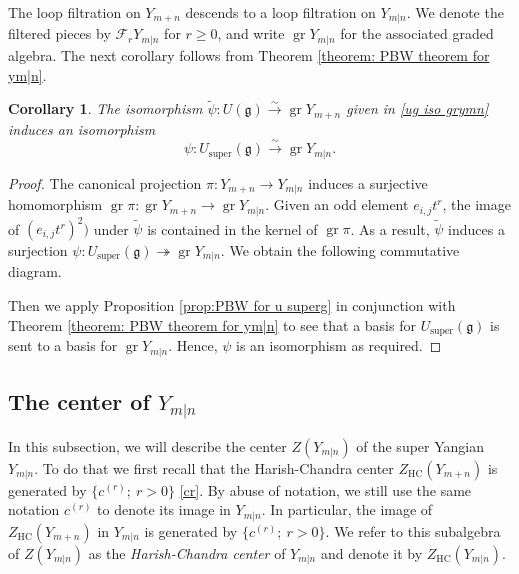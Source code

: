 \documentclass[12pt,reqno]{amsart}
\newcommand{\cF}{\mathcal{F}}
\newcommand{\fg}{\mathfrak{g}}
\DeclareMathOperator{\super}{super}
\DeclareMathOperator{\gr}{gr}
\DeclareMathOperator{\HC}{HC}
\numberwithin{equation}{section}
\newtheorem{Corollary}[Theorem]{Corollary}
\theoremstyle{Theorem}
\theoremstyle{remark}
\numberwithin{equation}{section}
\begin{document}
The loop filtration on $Y_{m+n}$ descends to a loop filtration on $Y_{m|n}$.
We denote the filtered pieces by $\cF_r Y_{m|n}$ for $ r\geq 0$,
and write $\gr Y_{m|n}$ for the associated graded algebra.
The next corollary follows from Theorem \ref{theorem: PBW theorem for ym|n}.
\begin{Corollary}\label{coro:u super g iso gr ym|n}
The isomorphism $\tilde{\psi}:U(\fg)\stackrel{\sim}{\longrightarrow}\gr Y_{m+n}$ given in \eqref{ug iso grymn} induces an isomorphism
\[
\psi:U_{\super}(\fg)\stackrel{\sim}{\longrightarrow}\gr Y_{m|n}.
\]
\end{Corollary}
\begin{proof}
The canonical projection $\pi:Y_{m+n}\rightarrow Y_{m|n}$ induces a surjective homomorphism $\gr\pi:\gr Y_{m+n}\rightarrow \gr Y_{m|n}$.
Given an odd element $e_{i,j}t^r$, 
the image of $(e_{i,j}t^r)^2)$ under $\tilde{\psi}$ is contained in the kernel of $\gr\pi$.
As a result,
$\tilde{\psi}$ induces a surjection $\psi:U_{\super}(\fg)\twoheadrightarrow\gr Y_{m|n}$.
We obtain the following commutative diagram.
\begin{center}
\end{center}
Then we apply Proposition \ref{prop:PBW for u superg} in conjunction with Theorem \ref{theorem: PBW theorem for ym|n} to see that a basis for $U_{\super}(\fg)$ is sent to a basis for $\gr Y_{m|n}$.
Hence, $\psi$ is an isomorphism as required.
\end{proof}
\subsection{ The center of $Y_{m|n}$}
In this subsection,
we will describe the center $Z(Y_{m|n})$ of the super Yangian $Y_{m|n}$.
To do that we first recall that the Harish-Chandra center $Z_{\HC}(Y_{m+n})$ is generated by $\{c^{(r)};~r>0\}$ \eqref{cr}.
By abuse of notation, 
we still use the same notation $c^{(r)}$ to denote its image in $Y_{m|n}$.
In particular, the image of $Z_{\HC}(Y_{m+n})$ in $Y_{m|n}$ is generated by $\{c^{(r)};~r>0\}$.
We refer to this subalgebra of $Z(Y_{m|n})$ as the {\it Harish-Chandra center} of $Y_{m|n}$ and denote it by $Z_{\HC}(Y_{m|n})$.
\end{document}
